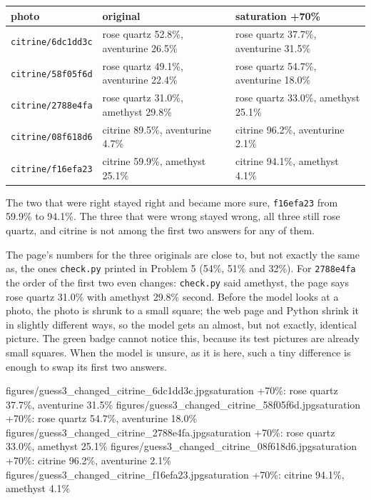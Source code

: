 \documentclass[11pt]{article}
\begin{document}
\begin{center}\footnotesize
\begin{tabular}{lll}
\toprule
photo & original & saturation +70\% \\
\midrule
\texttt{citrine/6dc1dd3c} & rose quartz 52.8\%, aventurine 26.5\% & rose quartz 37.7\%, aventurine 31.5\% \\
\texttt{citrine/58f05f6d} & rose quartz 49.1\%, aventurine 22.4\% & rose quartz 54.7\%, aventurine 18.0\% \\
\texttt{citrine/2788e4fa} & rose quartz 31.0\%, amethyst 29.8\% & rose quartz 33.0\%, amethyst 25.1\% \\
\texttt{citrine/08f618d6} & citrine 89.5\%, aventurine 4.7\% & citrine 96.2\%, aventurine 2.1\% \\
\texttt{citrine/f16efa23} & citrine 59.9\%, amethyst 25.1\% & citrine 94.1\%, amethyst 4.1\% \\
\bottomrule
\end{tabular}
\end{center}

The two that were right stayed right and became more sure, \texttt{f16efa23}
from 59.9\% to 94.1\%. The three that were wrong stayed wrong, all three still
rose quartz, and citrine is not among the first two answers for any of them.

The page's numbers for the three originals are close to, but not exactly the
same as, the ones \texttt{check.py} printed in Problem 5 (54\%, 51\% and 32\%).
For \texttt{2788e4fa} the order of the first two even changes: \texttt{check.py}
said amethyst, the page says rose quartz 31.0\% with amethyst 29.8\% second. Before
the model looks at a photo, the photo is shrunk to a small square; the web page
and Python shrink it in slightly different ways, so the model gets an almost, but
not exactly, identical picture. The green badge cannot notice this, because its
test pictures are already small squares. When the model is unsure, as it is
here, such a tiny difference is enough to swap its first two answers.

           {figures/guess3_changed_citrine_6dc1dd3c.jpg}{saturation +70\%: rose quartz 37.7\%, aventurine 31.5\%}
           {figures/guess3_changed_citrine_58f05f6d.jpg}{saturation +70\%: rose quartz 54.7\%, aventurine 18.0\%}
           {figures/guess3_changed_citrine_2788e4fa.jpg}{saturation +70\%: rose quartz 33.0\%, amethyst 25.1\%}
           {figures/guess3_changed_citrine_08f618d6.jpg}{saturation +70\%: citrine 96.2\%, aventurine 2.1\%}
           {figures/guess3_changed_citrine_f16efa23.jpg}{saturation +70\%: citrine 94.1\%, amethyst 4.1\%}
\end{document}
